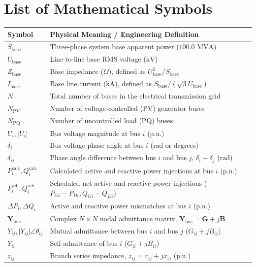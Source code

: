 \documentclass[12pt,a4paper,oneside]{report}
\begin{document}
\section*{List of Mathematical Symbols}
\begin{longtable}{ll}
\toprule
\textbf{Symbol} & \textbf{Physical Meaning / Engineering Definition} \\
\midrule
$S_{\text{base}}$ & Three-phase system base apparent power ($100.0\text{ MVA}$) \\
$U_{\text{base}}$ & Line-to-line base RMS voltage ($\text{kV}$) \\
$Z_{\text{base}}$ & Base impedance ($\Omega$), defined as $U_{\text{base}}^2 / S_{\text{base}}$ \\
$I_{\text{base}}$ & Base line current ($\text{kA}$), defined as $S_{\text{base}} / (\sqrt{3} U_{\text{base}})$ \\
$N$ & Total number of buses in the electrical transmission grid \\
$N_{\text{PV}}$ & Number of voltage-controlled (PV) generator buses \\
$N_{\text{PQ}}$ & Number of uncontrolled load (PQ) buses \\
$U_i, \vert{}U_i\vert{}$ & Bus voltage magnitude at bus $i$ ($\text{p.u.}$) \\
$\delta_i$ & Bus voltage phase angle at bus $i$ ($\text{rad}$ or degrees) \\
$\delta_{ij}$ & Phase angle difference between bus $i$ and bus $j$, $\delta_i - \delta_j$ ($\text{rad}$) \\
$P_i^{\text{calc}}, Q_i^{\text{calc}}$ & Calculated active and reactive power injections at bus $i$ ($\text{p.u.}$) \\
$P_i^{\text{sch}}, Q_i^{\text{sch}}$ & Scheduled net active and reactive power injections ($P_{Gi} - P_{Di}, Q_{Gi} - Q_{Di}$) \\
$\Delta P_i, \Delta Q_i$ & Active and reactive power mismatches at bus $i$ ($\text{p.u.}$) \\
$\mathbf{Y}_{\text{bus}}$ & Complex $N \times N$ nodal admittance matrix, $\mathbf{Y}_{\text{bus}} = \mathbf{G} + j\mathbf{B}$ \\
$Y_{ij}, \vert{}Y_{ij}\vert{}\angle\theta_{ij}$ & Mutual admittance between bus $i$ and bus $j$ ($G_{ij} + jB_{ij}$) \\
$Y_{ii}$ & Self-admittance of bus $i$ ($G_{ii} + jB_{ii}$) \\
$z_{ij}$ & Branch series impedance, $z_{ij} = r_{ij} + jx_{ij}$ ($\text{p.u.}$) \\

\end{longtable}
\end{document}
